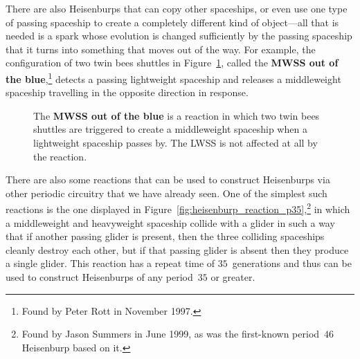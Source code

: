 There are also Heisenburps that can copy other spaceships, or even use one type of passing spaceship to create a completely different kind of object---all that is needed is a spark whose evolution is changed sufficiently by the passing spaceship that it turns into something that moves out of the way. For example, the configuration of two twin bees shuttles in Figure~\ref{fig:mwss_out_of_the_blue}, called the \textbf{MWSS out of the blue},\footnote{Found by Peter Rott in November 1997.} detects a passing lightweight spaceship and releases a middleweight spaceship travelling in the opposite direction in response.

\begin{figure}[!htb]
	\centering
	\caption{The \textbf{MWSS out of the blue} is a reaction in which two twin bees shuttles are triggered to create a middleweight spaceship when a lightweight spaceship passes by. The LWSS is not affected at all by the reaction.}\label{fig:mwss_out_of_the_blue}
\end{figure}

There are also some reactions that can be used to construct Heisenburps via other periodic circuitry that we have already seen. One of the simplest such reactions is the one displayed in Figure~\ref{fig:heisenburp_reaction_p35},\footnote{Found by Jason Summers in June 1999, as was the first-known period~$46$ Heisenburp based on it.} in which a middleweight and heavyweight spaceship collide with a glider in such a way that if another passing glider is present, then the three colliding spaceships cleanly destroy each other, but if that passing glider is absent then they produce a single glider. This reaction has a repeat time of $35$~generations and thus can be used to construct Heisenburps of any period~$35$ or greater.


